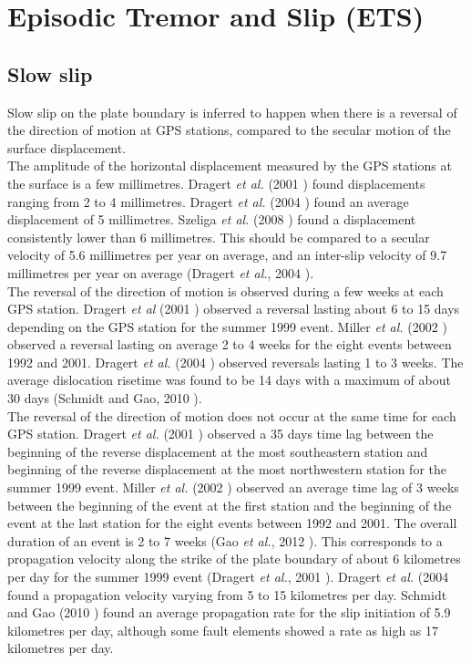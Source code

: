 \documentclass[main.tex]{subfiles}
\begin{document}
\part{Episodic Tremor and Slip (ETS)}

\chapter{Slow slip}

Slow slip on the plate boundary is inferred to happen when there is a reversal of the direction of motion at GPS stations, compared to the secular motion of the surface displacement. \\

The amplitude of the horizontal displacement measured by the GPS stations at the surface is a few millimetres. Dragert \textit{et al.} (2001 \cite{DRA_2001}) found displacements ranging from 2 to 4 millimetres. Dragert \textit{et al.} (2004 \cite{DRA_2004}) found an average displacement of 5 millimetres. Szeliga \textit{et al.} (2008 \cite{SZE_2008}) found a displacement consistently lower than 6 millimetres. This should be compared to a secular velocity of 5.6 millimetres per year on average, and an inter-slip velocity of 9.7 millimetres per year on average (Dragert \textit{et al.}, 2004 \cite{DRA_2004}). \\

The reversal of the direction of motion is observed during a few weeks at each GPS station. Dragert \textit{et al} (2001 \cite{DRA_2001}) observed a reversal lasting about 6 to 15 days depending on the GPS station for the summer 1999 event. Miller \textit{et al.} (2002 \cite{MIL_2002}) observed a reversal lasting on average 2 to 4 weeks for the eight events between 1992 and 2001. Dragert \textit{et al.} (2004 \cite{DRA_2004}) observed reversals lasting 1 to 3 weeks. The average dislocation risetime was found to be 14 days with a maximum of about 30 days (Schmidt and Gao, 2010 \cite{SCH_2010}).\\
 
The reversal of the direction of motion does not occur at the same time for each GPS station. Dragert \textit{et al.} (2001 \cite{DRA_2001}) observed a 35 days time lag between the beginning of the reverse displacement at the most southeastern station and beginning of the reverse displacement at the most northwestern station for the summer 1999 event. Miller \textit{et al.} (2002 \cite{MIL_2002}) observed an average time lag of 3 weeks between the beginning of the event at the first station and the beginning of the event at the last station for the eight events between 1992 and 2001. The overall duration of an event is 2 to 7 weeks (Gao \textit{et al.}, 2012 \cite{GAO_2012}). This corresponds to a propagation velocity along the strike of the plate boundary of about 6 kilometres per day for the summer 1999 event (Dragert \textit{et al.}, 2001 \cite{DRA_2001}). Dragert \textit{et al.} (2004 \cite{DRA_2004} found a propagation velocity varying from 5 to 15 kilometres per day. Schmidt and Gao (2010 \cite{SCH_2010}) found an average propagation rate for the slip initiation of 5.9 kilometres per day, although some fault elements showed a rate as high as 17 kilometres per day. \\
\end{document}
